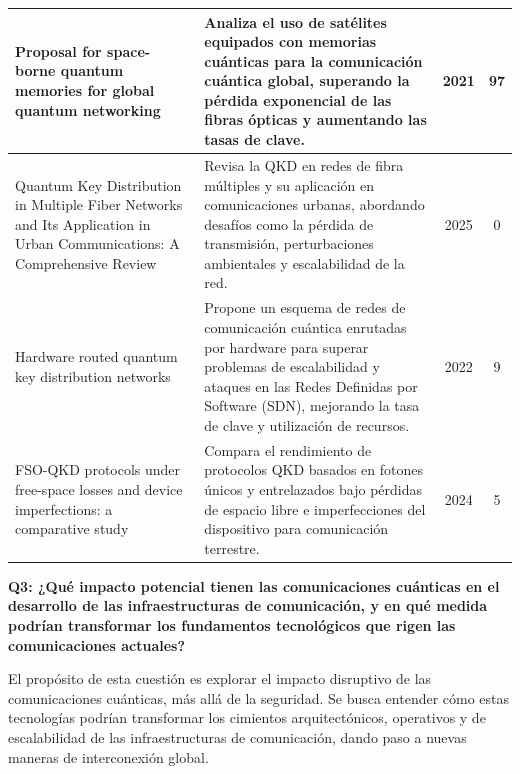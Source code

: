 \begin{longtable}{@{} p{4.5cm} p{6.5cm} c c @{}}
\hline
Proposal for space-borne quantum memories for global quantum networking~\cite{Gundogan2021} & Analiza el uso de satélites equipados con memorias cuánticas para la comunicación cuántica global, superando la pérdida exponencial de las fibras ópticas y aumentando las tasas de clave. & 2021 & 97 \\
\hline
Quantum Key Distribution in Multiple Fiber Networks and Its Application in Urban Communications: A Comprehensive Review~\cite{Granados2025} & Revisa la QKD en redes de fibra múltiples y su aplicación en comunicaciones urbanas, abordando desafíos como la pérdida de transmisión, perturbaciones ambientales y escalabilidad de la red. & 2025 & 0 \\
\hline
Hardware routed quantum key distribution networks~\cite{Singal2022} & Propone un esquema de redes de comunicación cuántica enrutadas por hardware para superar problemas de escalabilidad y ataques en las Redes Definidas por Software (SDN), mejorando la tasa de clave y utilización de recursos. & 2022 & 9 \\
\hline
FSO-QKD protocols under free-space losses and device imperfections: a comparative study~\cite{Sisodia2024} & Compara el rendimiento de protocolos QKD basados en fotones únicos y entrelazados bajo pérdidas de espacio libre e imperfecciones del dispositivo para comunicación terrestre. & 2024 & 5 \\
\end{longtable}

\vspace{7em} \textbf {Q3: ¿Qué impacto potencial tienen las comunicaciones cuánticas en el desarrollo de las infraestructuras de comunicación, y en qué medida podrían transformar los fundamentos tecnológicos que rigen las comunicaciones actuales?}

El propósito de esta cuestión es explorar el impacto disruptivo de las comunicaciones cuánticas, más allá de la seguridad. Se busca entender cómo estas tecnologías podrían transformar los cimientos arquitectónicos, operativos y de escalabilidad de las infraestructuras de comunicación, dando paso a nuevas maneras de interconexión global. 

